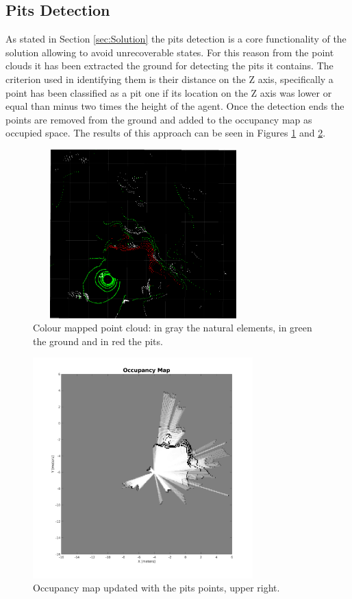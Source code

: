 \documentclass[twocolumn, a4paper]{article}
\begin{document}
\subsection{Pits Detection}
As stated in Section \ref{sec:Solution} the pits detection is a core
functionality of the solution allowing to avoid unrecoverable states. For
this reason from the point clouds it has been extracted the ground
for detecting the pits it contains. The criterion used in
identifying them is their distance on the Z axis,
specifically a point has been classified as a pit one if its location
on the Z axis was lower or equal than minus two times the height of the agent.
Once the detection ends the points are removed from the ground and
added to the occupancy map as occupied space.
The results of this approach can be seen in Figures \ref{fig:cloud_pits} and
\ref{fig:occupancy_pits}.
\begin{figure}[h!]
    \centering
    \includegraphics[width=8.5cm, height=6.5cm]{"../Report_images/Pits_3D_cloud.png"}
    \caption{Colour mapped point cloud: in gray the natural
             elements, in green the ground and in red the pits.}
    \label{fig:cloud_pits}
\end{figure}
\begin{figure}[h!]
    \centering
    \includegraphics[width=8.5cm]{"../Report_images/Occupancy_pits.png"}
    \caption{Occupancy map updated with the pits points, upper right.}
    \label{fig:occupancy_pits}
\end{figure}
\end{document}

